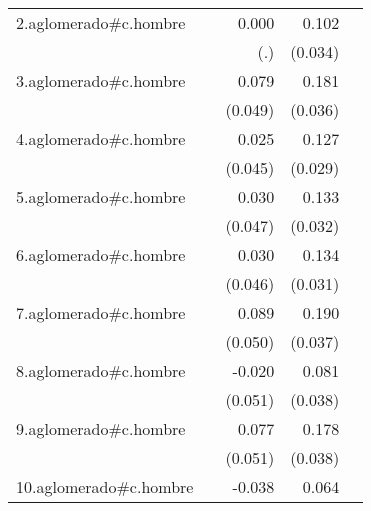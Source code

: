 {\begin{longtable}{l*{4}{D{.}{.}{-1}}}
\addlinespace
2.aglomerado#c.hombre&                     &       0.000         &       0.102\sym{**} &                     \\
            &                     &         (.)         &     (0.034)         &                     \\
\addlinespace
3.aglomerado#c.hombre&                     &       0.079         &       0.181\sym{***}&                     \\
            &                     &     (0.049)         &     (0.036)         &                     \\
\addlinespace
4.aglomerado#c.hombre&                     &       0.025         &       0.127\sym{***}&                     \\
            &                     &     (0.045)         &     (0.029)         &                     \\
\addlinespace
5.aglomerado#c.hombre&                     &       0.030         &       0.133\sym{***}&                     \\
            &                     &     (0.047)         &     (0.032)         &                     \\
\addlinespace
6.aglomerado#c.hombre&                     &       0.030         &       0.134\sym{***}&                     \\
            &                     &     (0.046)         &     (0.031)         &                     \\
\addlinespace
7.aglomerado#c.hombre&                     &       0.089         &       0.190\sym{***}&                     \\
            &                     &     (0.050)         &     (0.037)         &                     \\
\addlinespace
8.aglomerado#c.hombre&                     &      -0.020         &       0.081\sym{*}  &                     \\
            &                     &     (0.051)         &     (0.038)         &                     \\
\addlinespace
9.aglomerado#c.hombre&                     &       0.077         &       0.178\sym{***}&                     \\
            &                     &     (0.051)         &     (0.038)         &                     \\
\addlinespace
10.aglomerado#c.hombre&                     &      -0.038         &       0.064\sym{*}  &                     \\

\end{longtable}}
